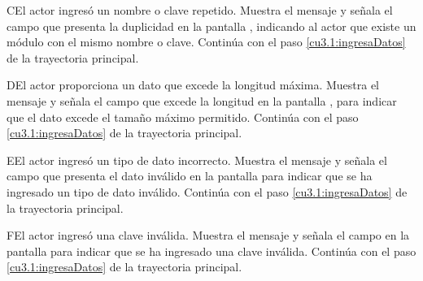  \begin{UCtrayectoriaA}{C}{El actor ingresó un nombre o clave repetido.}
    \UCpaso[\UCsist] Muestra el mensaje  y señala el campo que presenta la duplicidad en la pantalla 
	    , indicando al actor que existe un módulo con el mismo nombre o clave.
    \UCpaso[] Continúa con el paso \ref{cu3.1:ingresaDatos} de la trayectoria principal.
 \end{UCtrayectoriaA}
 
 \begin{UCtrayectoriaA}{D}{El actor proporciona un dato que excede la longitud máxima.}
    \UCpaso[\UCsist] Muestra el mensaje  y señala el campo que excede la 
    longitud en la pantalla , para indicar que el dato excede el tamaño máximo permitido.
    \UCpaso[] Continúa con el paso \ref{cu3.1:ingresaDatos} de la trayectoria principal.
 \end{UCtrayectoriaA}
 
 \begin{UCtrayectoriaA}{E}{El actor ingresó un tipo de dato incorrecto.}
    \UCpaso[\UCsist] Muestra el mensaje  y señala el campo que presenta el dato inválido en la 
    pantalla  para indicar que se ha ingresado un tipo de dato inválido.
    \UCpaso[] Continúa con el paso \ref{cu3.1:ingresaDatos} de la trayectoria principal.
 \end{UCtrayectoriaA}
 
 \begin{UCtrayectoriaA}{F}{El actor ingresó una clave inválida.}
    \UCpaso[\UCsist] Muestra el mensaje  y señala el campo en la 
    pantalla  para indicar que se ha ingresado una clave inválida.
    \UCpaso[] Continúa con el paso \ref{cu3.1:ingresaDatos} de la trayectoria principal.
 \end{UCtrayectoriaA}
 